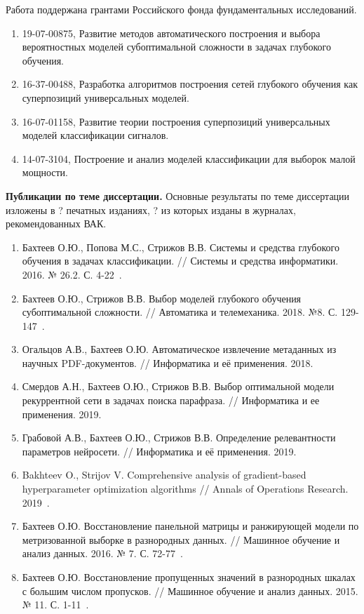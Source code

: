 Работа поддержана грантами Российского фонда фундаментальных исследований.
\begin{enumerate}
\item 19-07-00875, Развитие методов автоматического построения и выбора вероятностных моделей субоптимальной сложности в задачах глубокого обучения.
\item 16-37-00488, Разработка алгоритмов построения сетей глубокого обучения как суперпозиций универсальных моделей.
\item 16-07-01158, Развитие теории построения суперпозиций универсальных моделей классификации сигналов.
\item 14-07-3104,  Построение и анализ моделей классификации для выборок малой мощности.
\end{enumerate}

\vspace{0.5cm}
\textbf{Публикации по теме диссертации.} Основные результаты по теме диссертации изложены в ? печатных изданиях, ? из которых изданы в журналах, рекомендованных ВАК.
\begin{enumerate}
\item Бахтеев О.Ю., Попова М.С., Стрижов В.В. Системы и средства глубокого обучения в задачах классификации. // Системы и средства информатики. 2016. № 26.2. С. 4-22~\cite{popova}.
\item Бахтеев О.Ю., Стрижов В.В. Выбор моделей глубокого обучения субоптимальной сложности. // Автоматика и телемеханика. 2018. №8. С. 129-147~\cite{var_ait}.
\item Огальцов А.В., Бахтеев О.Ю. Автоматическое извлечение метаданных из научных PDF-документов. // Информатика и её применения. 2018.
\item Смердов А.Н., Бахтеев О.Ю., Стрижов В.В. Выбор оптимальной модели рекуррентной сети в задачах поиска парафраза. // Информатика и ее применения. 2019.
\item Грабовой А.В., Бахтеев О.Ю., Стрижов В.В. Определение релевантности параметров нейросети. // Информатика и её применения. 2019.
\item Bakhteev O., Strijov V. Comprehensive analysis of gradient-based hyperparameter optimization algorithms
// Annals of Operations Research. 2019~\cite{hyper_bakhteev}.


\item Бахтеев О.Ю. Восстановление панельной матрицы и ранжирующей модели по метризованной выборке в разнородных данных. // Машинное обучение и анализ данных. 2016. № 7. С. 72-77~\cite{panel}.
\item Бахтеев О.Ю. Восстановление пропущенных значений в разнородных шкалах с большим числом пропусков. // Машинное обучение и анализ данных. 2015. № 11. С. 1-11~\cite{knn}.

\end{enumerate}


